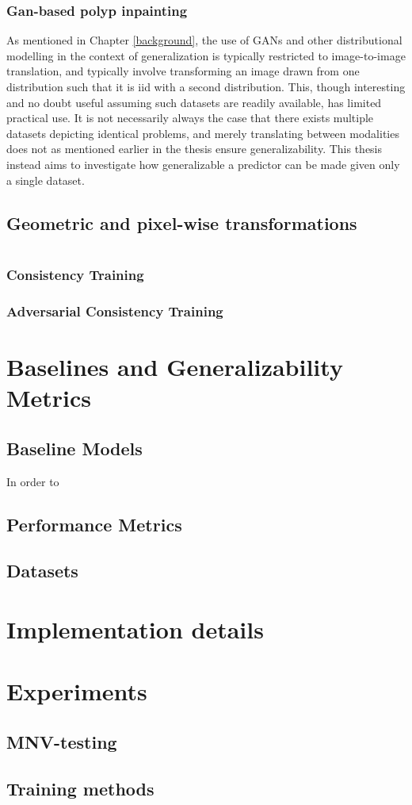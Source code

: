 \subsubsection{Gan-based polyp inpainting}
As mentioned in Chapter \ref{background}, the use of GANs and other distributional modelling in the context of generalization is typically restricted to image-to-image translation, and typically involve transforming an image drawn from one distribution such that it is iid with a second distribution. This, though interesting and no doubt useful assuming such datasets are readily available, has limited practical use. It is not necessarily always the case that there exists multiple datasets depicting identical problems, and merely translating between modalities does not as mentioned earlier in the thesis ensure generalizability. This thesis instead aims to investigate how generalizable a predictor can be made given only a single dataset. %
\subsection{Geometric and pixel-wise transformations}
\section{\alg}
    \subsubsection{Consistency Training}
    \subsubsection{Adversarial Consistency Training}
    \subsubsection{}
\section{Baselines and Generalizability Metrics}
    \subsection{Baseline Models}
        In order to 
    \subsection{Performance Metrics}
    \subsection{Datasets}
\section{Implementation details}
\section{Experiments}
    \subsection{MNV-testing}
    \subsection{Training methods}
